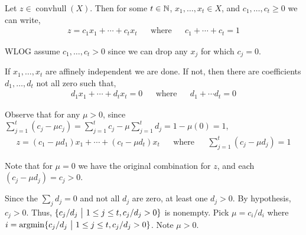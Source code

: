 \documentclass[10pt]{article}
\newcommand{\convhull}{\operatorname{convhull}}
\begin{document}
\begin{solution}

\iffalse
\begin{lemma}
Suppose \( x_1, \ldots, x_m \) are affinely independent vectors. Then \( cx_1, \ldots, cx_m \) are also affinely independent vectors for any \( c\neq 0 \).
\end{lemma}

Suppose \( x_1, \ldots, x_m \) are affinely independent, and let \( c\in\RR\setminus\{0\} \). Suppose \( \lambda_1 c x_1 + \cdots + \lambda_m c x_m = 0
 \) and \( \lambda_1 + \cdots + \lambda_m = 0 \). Then \( \lambda_1 c+ \cdots \lambda_m c = (\lambda_1 + \cdots + \lambda_m)c = 0 \), so by the affine independence of \( x_1, \ldots, x_m \), we have \( \lambda_1 = \cdots = \lambda_m = 0 \). That is, \( cx_1, \ldots, cx_m \) are affinely independent. \qed

\fi
Let \( z\in\convhull(X) \). Then for some \( t\in\mathbb{N} \), \( x_1, \ldots, x_t\in X \), and \( c_1, \ldots,c_t \geq 0 \) we can write,
\begin{align*}
    z = c_1 x_1 + \cdots + c_t x_t && \text{where} && c_1 + \cdots + c_t=1
\end{align*}

WLOG assume \( c_1, \ldots , c_t > 0 \) since we can drop any \( x_j \) for which \( c_j=0 \).

If \( x_1, \ldots, x_t \) are affinely independent we are done. If not, then there are coefficients \( d_1, \ldots, d_t \) not all zero such that,
\begin{align*}
    d_1x_1 + \cdots + d_tx_t = 0 && \text{where} && d_1+\cdots d_t = 0
\end{align*}

Observe that for any \( \mu >0 \), since \( \sum_{j=1}^{t}(c_j - \mu c_j) = \sum_{j=1}^{t}c_j - \mu \sum_{j=1}^{t}d_j = 1 - \mu (0) = 1 \),
\begin{align*}
    z = (c_1 - \mu d_1)x_1 + \cdots + (c_t - \mu d_t)x_t && \text{where} && \sum_{j=1}^{t} (c_j - \mu d_j) = 1
\end{align*}

Note that for \( \mu = 0 \) we have the original combination for \( z \), and each \( (c_j-\mu d_j) = c_j > 0 \). 

Since the \( \sum_{j}^{}d_j =0  \) and not all \( d_j \) are zero, at least one \( d_j>0 \). By hypothesis, \( c_j>0 \). Thus, \( \{c_j/d_j ~\big|~ 1\leq j\leq t, c_j/d_j > 0 \} \) is nonempty. Pick \( \mu = c_i / d_i  \) where \( i=\operatorname{argmin}\{ c_j/d_j ~\big|~ 1\leq j\leq t , c_j/d_j > 0\} \). Note \( \mu > 0 \).


\end{solution}
\end{document}
